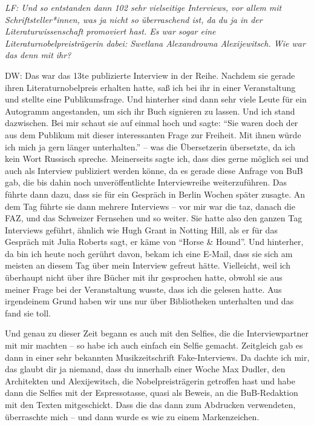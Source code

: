 \documentclass[a4paper,
fontsize=11pt,
oneside,
numbers=noperiodatend,
parskip=half-,
bibliography=totoc,
final
]{scrartcl}
\begin{document}
\emph{LF: Und so entstanden dann 102 sehr vielseitige Interviews, vor
allem mit Schriftsteller*innen, was ja nicht so überraschend ist, da du
ja in der Literaturwissenschaft promoviert hast. Es war sogar eine
Literaturnobelpreisträgerin dabei: Swetlana Alexandrowna Alexijewitsch.
Wie war das denn mit ihr?}

DW: Das war das 13te publizierte Interview in der Reihe. Nachdem sie
gerade ihren Literaturnobelpreis erhalten hatte, saß ich bei ihr in
einer Veranstaltung und stellte eine Publikumsfrage. Und hinterher sind
dann sehr viele Leute für ein Autogramm angestanden, um sich ihr Buch
signieren zu lassen. Und ich stand dazwischen. Bei mir schaut sie auf
einmal hoch und sagte: \enquote{Sie waren doch der aus dem Publikum mit
dieser interessanten Frage zur Freiheit. Mit ihnen würde ich mich ja
gern länger unterhalten.} -- was die Übersetzerin übersetzte, da ich
kein Wort Russisch spreche. Meinerseits sagte ich, dass dies gerne
möglich sei und auch als Interview publiziert werden könne, da es gerade
diese Anfrage von BuB gab, die bis dahin noch unveröffentlichte
Interviewreihe weiterzuführen. Das führte dann dazu, dass sie für ein
Gespräch in Berlin Wochen später zusagte. An dem Tag führte sie
dann mehrere Interviews -- vor mir war die taz, danach die FAZ, und das
Schweizer Fernsehen und so weiter. Sie hatte also den ganzen Tag
Interviews geführt, ähnlich wie Hugh Grant in Notting Hill, als er für
das Gespräch mit Julia Roberts sagt, er käme von \enquote{Horse \&
Hound}. Und hinterher, da bin ich heute noch gerührt davon, bekam ich
eine E-Mail, dass sie sich am meisten an diesem Tag über mein Interview
gefreut hätte. Vielleicht, weil ich überhaupt nicht über ihre Bücher mit
ihr gesprochen hatte, obwohl sie aus meiner Frage bei der Veranstaltung
wusste, dass ich die gelesen hatte. Aus irgendeinem Grund haben wir uns
nur über Bibliotheken unterhalten und das fand sie toll.

Und genau zu dieser Zeit begann es auch mit den Selfies, die die
Interviewpartner mit mir machten -- so habe ich auch einfach ein Selfie
gemacht. Zeitgleich gab es dann in einer sehr bekannten Musikzeitschrift
Fake-Interviews. Da dachte ich mir, das glaubt dir ja niemand, dass du
innerhalb einer Woche Max Dudler, den Architekten und Alexijewitsch, die
Nobelpreisträgerin getroffen hast und habe dann die Selfies mit der
Espressotasse, quasi als Beweis, an die BuB-Redaktion mit den Texten
mitgeschickt. Dass die das dann zum Abdrucken verwendeten, überraschte
mich -- und dann wurde es wie zu einem Markenzeichen.
\end{document}
